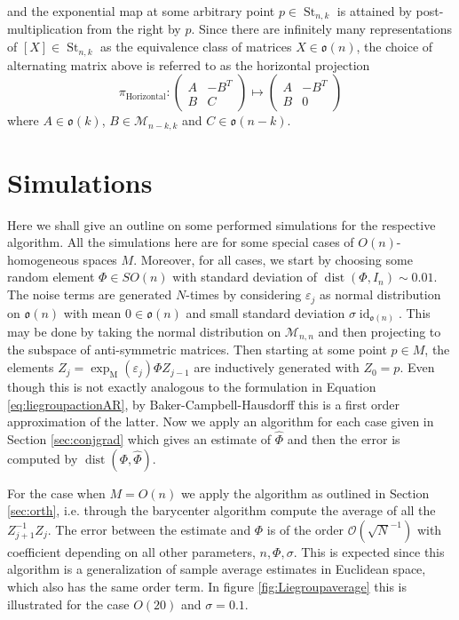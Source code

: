 \documentclass[12pt,a4paper]{article}
\theoremstyle{definition}
\theoremstyle{remark}
\DeclareMathOperator{\dist}{dist}
\DeclareMathOperator{\id}{id}
\DeclareMathOperator{\St}{St}
\begin{document}
and the exponential map at some arbitrary point $p\in \St_{n,k}$ is attained by post-multiplication from the right by $p$. Since there are infinitely many representations of $[X]\in \St_{n,k}$ as the equivalence class of matrices $X\in \mathfrak{o}(n)$, the choice of alternating matrix above is referred to as the horizontal projection
\[
\pi_{\text{Horizontal}}: \begin{pmatrix}
A & -B^T\\ B& C
\end{pmatrix} \longmapsto \begin{pmatrix}
A & -B^T\\ B& 0
\end{pmatrix}
\]
where $A\in \mathfrak{o}(k)$, $B\in \mathcal{M}_{n-k,k}$ and $C\in \mathfrak{o}(n-k)$.

\section{Simulations}
\label{sec:simulations}



Here we shall give an outline on some performed simulations for the respective algorithm. All the simulations here are for some special cases of $O(n)$-homogeneous spaces $M$. Moreover, for all cases, we start by  choosing some random element $\Phi \in SO(n)$ with standard deviation of $\dist(\Phi,I_n)\sim 0.01$. The noise terms are generated $N$-times by considering $\varepsilon_j$ as normal distribution on $\mathfrak{o}(n)$ with mean $0\in \mathfrak{o}(n)$ and small standard deviation $\sigma \id_{\mathfrak{o}(n)}$. This may be done by taking the normal distribution on $\mathcal{M}_{n,n}$ and then projecting to the subspace of anti-symmetric matrices. Then starting at some point $p\in M$, the elements $Z_{j}=\exp_{\mathrm{M}}(\varepsilon_j)\Phi Z_{j-1}$ are inductively generated with $Z_{0}=p$. Even though this is not exactly analogous to the formulation in Equation \eqref{eq:liegroupactionAR}, by Baker-Campbell-Hausdorff this is a first order approximation of the latter. Now we apply an algorithm for each case given in Section \ref{sec:conjgrad} which gives an estimate of $\hat{\Phi}$ and then the error is computed by $\dist(\Phi,\hat{\Phi})$.

For the case when $M=O(n)$ we apply the algorithm as outlined in Section \ref{sec:orth}, i.e. through the barycenter algorithm compute the average of all the $Z_{j+1}^{-1} Z_j$. The error between the estimate and $\Phi$ is of the order $\mathcal{O}(\sqrt{N}^{-1})$ with coefficient depending on all other parameters, $n,\Phi,\sigma$. This is expected since this algorithm is a generalization of sample average estimates in Euclidean space, which also has the same order term. In figure \ref{fig:Liegroupaverage} this is illustrated for the case $O(20)$ and $\sigma=0.1$.
\end{document}
